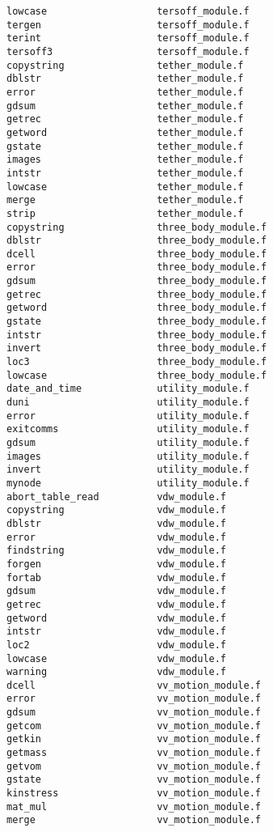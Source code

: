 \begin{verbatim}
lowcase                   tersoff_module.f
tergen                    tersoff_module.f
terint                    tersoff_module.f
tersoff3                  tersoff_module.f
copystring                tether_module.f
dblstr                    tether_module.f
error                     tether_module.f
gdsum                     tether_module.f
getrec                    tether_module.f
getword                   tether_module.f
gstate                    tether_module.f
images                    tether_module.f
intstr                    tether_module.f
lowcase                   tether_module.f
merge                     tether_module.f
strip                     tether_module.f
copystring                three_body_module.f
dblstr                    three_body_module.f
dcell                     three_body_module.f
error                     three_body_module.f
gdsum                     three_body_module.f
getrec                    three_body_module.f
getword                   three_body_module.f
gstate                    three_body_module.f
intstr                    three_body_module.f
invert                    three_body_module.f
loc3                      three_body_module.f
lowcase                   three_body_module.f
date_and_time             utility_module.f
duni                      utility_module.f
error                     utility_module.f
exitcomms                 utility_module.f
gdsum                     utility_module.f
images                    utility_module.f
invert                    utility_module.f
mynode                    utility_module.f
abort_table_read          vdw_module.f
copystring                vdw_module.f
dblstr                    vdw_module.f
error                     vdw_module.f
findstring                vdw_module.f
forgen                    vdw_module.f
fortab                    vdw_module.f
gdsum                     vdw_module.f
getrec                    vdw_module.f
getword                   vdw_module.f
intstr                    vdw_module.f
loc2                      vdw_module.f
lowcase                   vdw_module.f
warning                   vdw_module.f
dcell                     vv_motion_module.f
error                     vv_motion_module.f
gdsum                     vv_motion_module.f
getcom                    vv_motion_module.f
getkin                    vv_motion_module.f
getmass                   vv_motion_module.f
getvom                    vv_motion_module.f
gstate                    vv_motion_module.f
kinstress                 vv_motion_module.f
mat_mul                   vv_motion_module.f
merge                     vv_motion_module.f

\end{verbatim}
